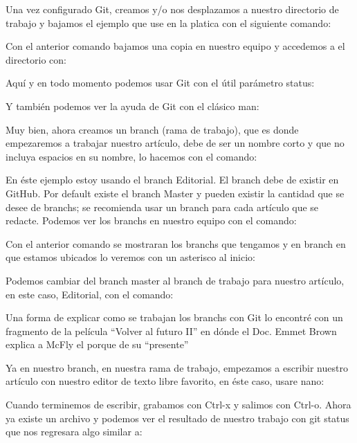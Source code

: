 \begin{multicols}{2}
Una vez configurado Git, creamos y/o nos desplazamos a nuestro directorio de trabajo y bajamos el ejemplo que use en la platica con el siguiente comando:\par

Con el anterior comando bajamos una copia en nuestro equipo y accedemos a el directorio con:\par

Aquí y en todo momento podemos usar Git con el útil parámetro status:\par

Y también podemos ver la ayuda de Git con el clásico man:\par

Muy bien, ahora creamos un branch (rama de trabajo), que es donde empezaremos a trabajar nuestro artículo, debe de ser un nombre corto y que no incluya espacios en su nombre, lo hacemos con el comando:\par

En éste ejemplo estoy usando el branch Editorial. El branch debe de existir en GitHub. Por default existe el branch Master y pueden existir la cantidad que se desee de branchs; se recomienda usar un branch para cada artículo que se redacte. Podemos ver los branchs en nuestro equipo con el comando:\par

Con el anterior comando se mostraran los branchs que tengamos y en branch en que estamos ubicados lo veremos con un asterisco al inicio:\par

Podemos cambiar del branch master al branch de trabajo para nuestro artículo, en este caso, Editorial, con el comando:\par

Una forma de explicar como se trabajan los branchs con Git lo encontré con un fragmento de la película “Volver al futuro II” en dónde el Doc. Emmet Brown explica a McFly el porque de su “presente”\par

Ya en nuestro branch, en nuestra rama de trabajo, empezamos a escribir nuestro artículo con nuestro editor de texto libre favorito, en éste caso, usare nano:\par

Cuando terminemos de escribir, grabamos con Ctrl-x y salimos con Ctrl-o. Ahora ya existe un archivo y podemos ver el resultado de nuestro trabajo con git status que nos regresara algo similar a:\par


\end{multicols}
